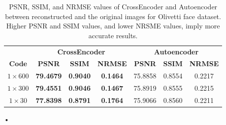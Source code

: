 \documentclass{jcmlatex}
\begin{document}
\begin{table}[ht]
\caption{PSNR, SSIM, and NRMSE values of CrossEncoder and Autoencoder between reconstructed and the original images for Olivetti face dataset.  Higher PSNR and SSIM values, and lower NRSME values, imply more accurate results.}
\begin{center}
\noindent\begin{tabular}{|c|c|c|c|c|c|c|}
\toprule
& \multicolumn{3}{c|}{\textbf{CrossEncoder}} & \multicolumn{3}{c|}{\textbf{Autoencoder}} \\
\cmidrule(r){2-4}\cmidrule(l){5-7}
\textbf{Code} & \textbf{PSNR} & \textbf{SSIM} & \textbf{NRMSE}  & \textbf{PSNR} & \textbf{SSIM} & \textbf{NRMSE} \\
\midrule
$1\times600$  & \textbf{79.4679} & \textbf{0.9040} &  \textbf{0.1464} & 75.8858 & 0.8554 &  0.2217\\ [0.5ex]
$1\times300$  & \textbf{79.4551} & \textbf{0.9046} &  \textbf{0.1467} & 75.8919 & 0.8555 &  0.2215\\ [0.5ex]
$1\times30$  & \textbf{77.8398} & \textbf{0.8791} & \textbf{0.1764} & 75.9066 & 0.8560 &  0.2211\\ [0.5ex]
\bottomrule
\end{tabular}
\end{center}•
\label{table8}
\vspace{-1em}

\end{table}
\end{document}
